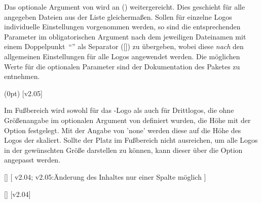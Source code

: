\begin{DeclareEntity*}{}
\begin{DeclareEntity*}{}
\begin{DeclareEntity*}{}
\begin{Declaration}
\begin{Declaration}
Das optionale Argument von  wird an 
() weitergereicht. Dies geschieht für 
alle angegeben Dateien aus der Liste gleichermaßen. Sollen für einzelne Logos 
individuelle Einstellungen vorgenommen werden, so sind die entsprechenden 
Parameter im obligatorischen Argument nach dem jeweiligen Dateinamen mit einem 
Doppelpunkt~\enquote{\PValue{:}} als Separator 
([]) zu übergeben, 
wobei diese \emph{nach} den allgemeinen Einstellungen für alle Logos angewendet 
werden. Die möglichen Werte für die optionalen Parameter sind der Dokumentation 
des Paketes  zu entnehmen.
\end{Declaration}
\end{Declaration}

\begin{Declaration}
  {}
  (0pt)
  [v2.05]

Im Fußbereich wird sowohl für das \DDC-Logo als auch für Drittlogos, die ohne 
Größenangabe im optionalen Argument von  definiert wurden, die 
Höhe mit der Option  festgelegt. Mit der Angabe 
von  'none' werden diese auf die Höhe des Logos der 
\TnUD skaliert. Sollte der Platz im Fußbereich nicht ausreichen, um alle Logos 
in der gewünschten Größe darstellen zu können, kann dieser über die Option
 angepasst werden.
\end{Declaration}

\begin{Declaration}
  {[]}
[%
  v2.04;
  v2.05:Änderung des Inhaltes nur einer Spalte möglich
]
\begin{Declaration}
  {[]}
  [v2.04]


\end{Declaration}
\end{Declaration}
\end{DeclareEntity*}
\end{DeclareEntity*}
\end{DeclareEntity*}
